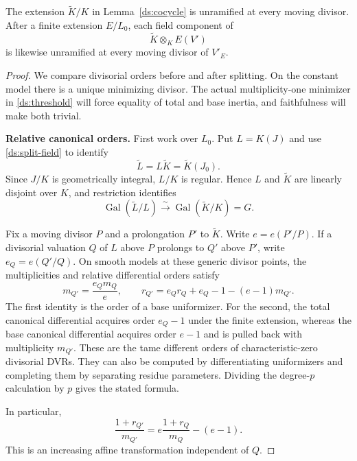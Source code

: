 \begin{proposition}
\label{ds:unramified}
The extension $\widetilde K/K$ in
Lemma~\ref{ds:cocycle} is unramified at every moving divisor.
After a finite extension $E/L_0$, each field component of
\[
 \widetilde K\otimes_K E(V')
\]
is likewise unramified at every moving divisor of $V'_E$.
\end{proposition}

\begin{proof}
We compare divisorial orders before and after splitting.  On the
constant model there is a unique minimizing divisor.  The actual
multiplicity-one minimizer in \eqref{ds:threshold} will force equality
of total and base inertia, and faithfulness will make both trivial.

\smallskip\noindent\textbf{Relative canonical orders.}\enspace
First work over $L_0$.  Put $L=K(J)$ and use
\eqref{ds:split-field} to identify
\[
 \widetilde L=L\widetilde K=\widetilde K(J_0).
\]
Since $J/K$ is geometrically integral, $L/K$ is regular.  Hence
$L$ and $\widetilde K$ are linearly disjoint over $K$, and
restriction identifies
\begin{equation}
 \operatorname{Gal}(\widetilde L/L)
      \xrightarrow{\sim}
 \operatorname{Gal}(\widetilde K/K)=G.
 \label{ds:regular-galois}
\end{equation}

Fix a moving divisor $P$ and a prolongation $P'$ to
$\widetilde K$.  Write $e=e(P'/P)$.  If a divisorial valuation
$Q$ of $L$ above $P$ prolongs to $Q'$ above $P'$, write
$e_Q=e(Q'/Q)$.  On smooth models at these generic divisor points,
the multiplicities and relative differential orders satisfy
\begin{equation}
 m_{Q'}=\frac{e_Qm_Q}{e},
 \qquad
 r_{Q'}=e_Qr_Q+e_Q-1-(e-1)m_{Q'}.
 \label{ds:ramification-orders}
\end{equation}
The first identity is the order of a base uniformizer.  For the
second, the total canonical differential acquires order $e_Q-1$
under the finite extension, whereas the base canonical
differential acquires order $e-1$ and is pulled back with
multiplicity $m_{Q'}$.  These are the tame different orders of
characteristic-zero divisorial DVRs.  They can also be computed
by differentiating uniformizers and completing them by separating
residue parameters.  Dividing the degree-$p$ calculation by $p$
gives the stated formula.

In particular,
\begin{equation}
 \frac{1+r_{Q'}}{m_{Q'}}
   =e\frac{1+r_Q}{m_Q}-(e-1).
 \label{ds:affine-threshold}
\end{equation}
This is an increasing affine transformation independent of $Q$.


\end{proof}

